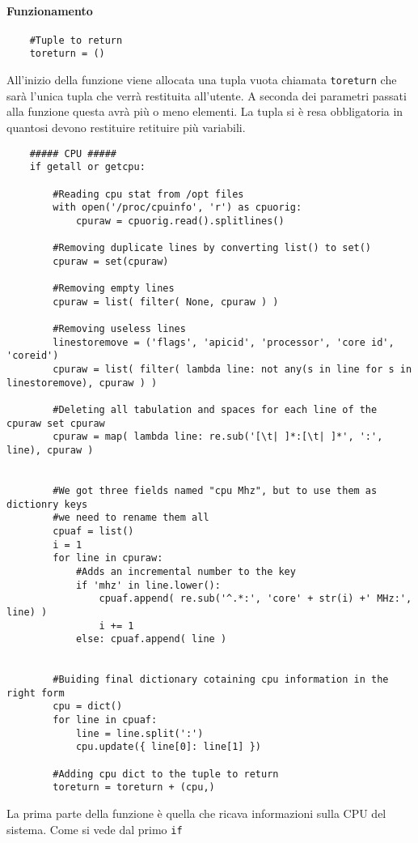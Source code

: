 \documentclass[11pt]{article}
\begin{document}
\paragraph{Funzionamento}
\begin{lstlisting}
    #Tuple to return
    toreturn = ()
\end{lstlisting}
All'inizio della funzione viene allocata una tupla vuota chiamata \texttt{toreturn} che sarà l'unica tupla che verrà
restituita all'utente. A seconda dei parametri passati alla funzione questa avrà più o meno elementi. La tupla si è
resa obbligatoria in quantosi devono restituire retituire più variabili.
\begin{lstlisting}
    ##### CPU #####
    if getall or getcpu:

        #Reading cpu stat from /opt files
        with open('/proc/cpuinfo', 'r') as cpuorig:
            cpuraw = cpuorig.read().splitlines()

        #Removing duplicate lines by converting list() to set()
        cpuraw = set(cpuraw)
        
        #Removing empty lines
        cpuraw = list( filter( None, cpuraw ) )
    
        #Removing useless lines
        linestoremove = ('flags', 'apicid', 'processor', 'core id', 'coreid')
        cpuraw = list( filter( lambda line: not any(s in line for s in linestoremove), cpuraw ) )
    
        #Deleting all tabulation and spaces for each line of the cpuraw set cpuraw
        cpuraw = map( lambda line: re.sub('[\t| ]*:[\t| ]*', ':', line), cpuraw )
    
    
        #We got three fields named "cpu Mhz", but to use them as dictionry keys
        #we need to rename them all
        cpuaf = list()
        i = 1
        for line in cpuraw:
            #Adds an incremental number to the key
            if 'mhz' in line.lower():
                cpuaf.append( re.sub('^.*:', 'core' + str(i) +' MHz:', line) )
                i += 1
            else: cpuaf.append( line )
    
    
        #Buiding final dictionary cotaining cpu information in the right form
        cpu = dict()
        for line in cpuaf:
            line = line.split(':')
            cpu.update({ line[0]: line[1] })

        #Adding cpu dict to the tuple to return
        toreturn = toreturn + (cpu,)
\end{lstlisting}
La prima parte della funzione è quella che ricava informazioni sulla CPU del sistema. Come si vede dal primo \texttt{if}
\end{document}
